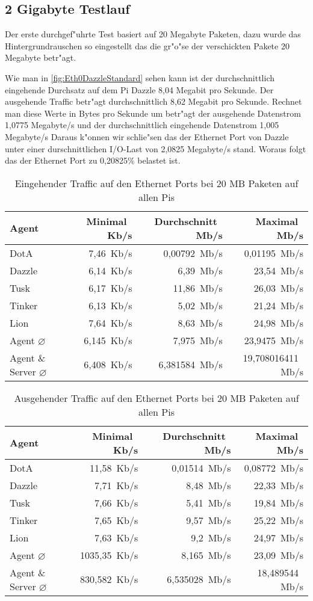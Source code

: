 \subsection{2 Gigabyte Testlauf}
\label{subsec:2GBTest}
Der erste durchgef"uhrte Test basiert auf 20 Megabyte Paketen, dazu wurde das Hintergrundrauschen %
so eingestellt das die gr"o"se der verschickten Pakete 20 Megabyte betr"agt. 

Wie man in \cref{fig:Eth0DazzleStandard} sehen kann ist der durchschnittlich eingehende Durchsatz auf dem Pi Dazzle 8,04 Megabit %
pro Sekunde. Der ausgehende Traffic betr"agt durchschnittlich 8,62 Megabit pro Sekunde. Rechnet man diese Werte in Bytes pro Sekunde um %
betr"agt der ausgehende Datenstrom 1,0775 Megabyte/s und der durchschnittlich eingehende Datenstrom 1,005 Megabyte/s %
Daraus k"onnen wir schlie"sen das der Ethernet Port von Dazzle unter einer durschnittlichen I/O-Last von 2,0825 Megabyte/s stand. %
Woraus folgt das der Ethernet Port zu 0,20825\% belastet ist.
\begin{table}
\centering
\begin{tabular}{l%
 r<{\,Kb/s}%
 r<{\,Mb/s}%
 r<{\,Mb/s}%
}
Agent  				& Minimal		& Durchschnitt		& Maximal	\\
\hline
DotA				& 7,46			& 0,00792		& 0,01195	\\		
Dazzle 				& 6,14			& 6,39			& 23,54		\\
Tusk 				& 6,17			& 11,86			& 26,03		\\
Tinker				& 6,13			& 5,02			& 21,24		\\
Lion				& 7,64			& 8,63			& 24,98		\\ 
Agent $\diameter $	 	& 6,145			& 7,975			& 23,9475	\\   
Agent \& Server $\diameter$   	& 6,408			& 6,381584		& 19,708016411	\\ 

\end{tabular}
\caption{Eingehender Traffic auf den Ethernet Ports bei 20 MB Paketen auf allen Pis}
\label{tab:EingehenderTraffic2GB}
\end{table}

\begin{table}
\centering
\begin{tabular}{l%
 r<{\,Kb/s}%
 r<{\,Mb/s}%
 r<{\,Mb/s}%
}
Agent  				& Minimal		& Durchschnitt		& Maximal	\\	
\hline
DotA				& 11,58			& 0,01514		& 0,08772	\\
Dazzle 				& 7,71			& 8,48	 		& 22,33		\\
Tusk 				& 7,66			& 5,41			& 19,84		\\
Tinker				& 7,65			& 9,57			& 25,22		\\
Lion				& 7,63			& 9,2			& 24,97		\\ 
Agent $\diameter $	 	& 1035,35		& 8,165			& 23,09		\\   
Agent \& Server $\diameter$   	& 830,582		& 6,535028		& 18,489544	\\ 

\end{tabular}
\caption{Ausgehender Traffic auf den Ethernet Ports bei 20 MB Paketen auf allen Pis}
\label{tab:AusgehenderTraffic2GB}
\end{table}


